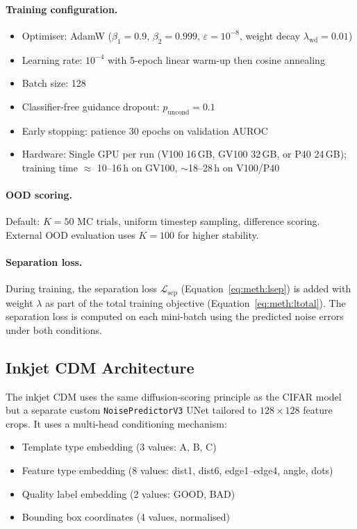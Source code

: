 \paragraph{Training configuration.}
\begin{itemize}
  \item Optimiser: AdamW ($\beta_1 = 0.9$, $\beta_2 = 0.999$,
        $\varepsilon = 10^{-8}$, weight decay
        $\lambda_{\mathrm{wd}} = 0.01$)
  \item Learning rate: $10^{-4}$ with 5-epoch linear warm-up then cosine
        annealing
  \item Batch size: 128
  \item Classifier-free guidance dropout:
        $p_{\mathrm{uncond}} = 0.1$
  \item Early stopping: patience 30 epochs on validation AUROC
  \item Hardware: Single GPU per run (V100 16\,GB, GV100 32\,GB, or
        P40 24\,GB); training time $\approx$ 10--16\,h on GV100,
        ${\sim}$18--28\,h on V100/P40
\end{itemize}

\paragraph{OOD scoring.}
Default: $K = 50$ MC trials, uniform timestep sampling, difference
scoring. External OOD evaluation uses $K = 100$ for higher stability.

\paragraph{Separation loss.}
During training, the separation loss $\mathcal{L}_{\text{sep}}$
(Equation~\ref{eq:meth:lsep}) is added with weight $\lambda$ as part of
the total training objective
(Equation~\ref{eq:meth:ltotal}). The separation loss is computed on each
mini-batch using the predicted noise errors under both conditions.

\subsection{Inkjet CDM Architecture}
\label{sec:exp:impl:inkjet-cdm}

The inkjet CDM uses the same diffusion-scoring principle as the CIFAR
model but a separate custom \texttt{NoisePredictorV3} UNet tailored to
$128 \times 128$ feature crops. It uses a multi-head conditioning
mechanism:
\begin{itemize}
  \item Template type embedding (3 values: A, B, C)
  \item Feature type embedding (8 values: dist1, dist6, edge1--edge4,
        angle, dots)
  \item Quality label embedding (2 values: GOOD, BAD)
  \item Bounding box coordinates (4 values, normalised)
\end{itemize}

